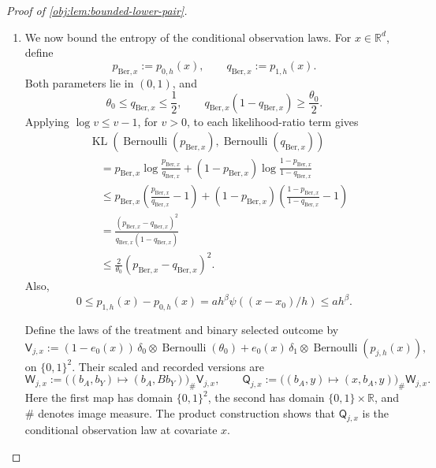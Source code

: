 \begin{proof}[Proof of \cref{obj:lem:bounded-lower-pair}]
\begin{enumerate}
\item We now bound the entropy of the conditional observation laws.
For \(x\in\mathbb R^d\), define
\[
p_{\mathrm{Ber},x}:=p_{0,h}(x),
\qquad
q_{\mathrm{Ber},x}:=p_{1,h}(x).
\]
Both parameters lie in \((0,1)\), and
\[
\theta_0\le q_{\mathrm{Ber},x}\le\frac12,
\qquad
q_{\mathrm{Ber},x}(1-q_{\mathrm{Ber},x})
\ge\frac{\theta_0}{2}.
\]
Applying \(\log v\le v-1\), for \(v>0\), to each likelihood-ratio term gives
\[
\begin{aligned}
&\operatorname{KL}\!\left(
\operatorname{Bernoulli}(p_{\mathrm{Ber},x}),
\operatorname{Bernoulli}(q_{\mathrm{Ber},x})
\right)\\
&\quad=
p_{\mathrm{Ber},x}\log\frac{p_{\mathrm{Ber},x}}{q_{\mathrm{Ber},x}}
+(1-p_{\mathrm{Ber},x})
 \log\frac{1-p_{\mathrm{Ber},x}}{1-q_{\mathrm{Ber},x}}\\
&\quad\le
p_{\mathrm{Ber},x}
 \left(\frac{p_{\mathrm{Ber},x}}{q_{\mathrm{Ber},x}}-1\right)
+(1-p_{\mathrm{Ber},x})
 \left(\frac{1-p_{\mathrm{Ber},x}}{1-q_{\mathrm{Ber},x}}-1\right)\\
&\quad=
\frac{(p_{\mathrm{Ber},x}-q_{\mathrm{Ber},x})^2}
     {q_{\mathrm{Ber},x}(1-q_{\mathrm{Ber},x})}\\
&\quad\le
\frac{2}{\theta_0}(p_{\mathrm{Ber},x}-q_{\mathrm{Ber},x})^2.
\end{aligned}
\]
Also,
\[
0\le p_{1,h}(x)-p_{0,h}(x)
=ah^\beta\psi((x-x_0)/h)
\le ah^\beta.
\]

Define the laws of the treatment and binary selected outcome by
\[
\mathsf V_{j,x}:=
(1-e_0(x))\,\delta_0\otimes\operatorname{Bernoulli}(\theta_0)
+
e_0(x)\,\delta_1\otimes\operatorname{Bernoulli}(p_{j,h}(x)),
\]
on \(\{0,1\}^2\). Their scaled and recorded versions are
\[
\mathsf W_{j,x}
:=
\bigl((b_A,b_Y)\mapsto(b_A,Bb_Y)\bigr)_\#\mathsf V_{j,x},
\qquad
\mathsf Q_{j,x}
:=
\bigl((b_A,y)\mapsto(x,b_A,y)\bigr)_\#\mathsf W_{j,x}.
\]
Here the first map has domain \(\{0,1\}^2\), the second has domain
\(\{0,1\}\times\mathbb R\), and \(\#\) denotes image measure.
The product construction shows that \(\mathsf Q_{j,x}\) is the
conditional observation law at covariate \(x\).


\end{enumerate}
\end{proof}
